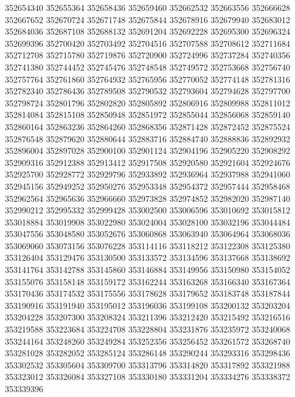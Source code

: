 { 352654340
 352655364
 352658436
 352659460
 352662532
 352663556
 352666628
 352667652
 352670724
 352671748
 352675844
 352678916
 352679940
 352683012
 352684036
 352687108
 352688132
 352691204
 352692228
 352695300
 352696324
 352699396
 352700420
 352703492
 352704516
 352707588
 352708612
 352711684
 352712708
 352715780
 352719876
 352720900
 352724996
 352737284
 352740356
 352741380
 352744452
 352745476
 352748548
 352749572
 352753668
 352756740
 352757764
 352761860
 352764932
 352765956
 352770052
 352774148
 352781316
 352782340
 352786436
 352789508
 352790532
 352793604
 352794628
 352797700
 352798724
 352801796
 352802820
 352805892
 352806916
 352809988
 352811012
 352814084
 352815108
 352850948
 352851972
 352855044
 352856068
 352859140
 352860164
 352863236
 352864260
 352868356
 352871428
 352872452
 352875524
 352876548
 352879620
 352880644
 352883716
 352884740
 352888836
 352892932
 352896004
 352897028
 352900100
 352901124
 352904196
 352905220
 352908292
 352909316
 352912388
 352913412
 352917508
 352920580
 352921604
 352924676
 352925700
 352928772
 352929796
 352933892
 352936964
 352937988
 352941060
 352945156
 352949252
 352950276
 352953348
 352954372
 352957444
 352958468
 352962564
 352965636
 352966660
 352973828
 352974852
 352982020
 352987140
 352990212
 352995332
 352999428
 353002500
 353006596
 353010692
 353015812
 353018884
 353019908
 353022980
 353024004
 353028100
 353032196
 353044484
 353047556
 353048580
 353052676
 353060868
 353063940
 353064964
 353068036
 353069060
 353073156
 353076228
 353114116
 353118212
 353122308
 353125380
 353126404
 353129476
 353130500
 353133572
 353134596
 353137668
 353138692
 353141764
 353142788
 353145860
 353146884
 353149956
 353150980
 353154052
 353155076
 353158148
 353159172
 353162244
 353163268
 353166340
 353167364
 353170436
 353174532
 353175556
 353178628
 353179652
 353183748
 353187844
 353190916
 353191940
 353195012
 353196036
 353199108
 353200132
 353203204
 353204228
 353207300
 353208324
 353211396
 353212420
 353215492
 353216516
 353219588
 353223684
 353224708
 353228804
 353231876
 353235972
 353240068
 353244164
 353248260
 353249284
 353252356
 353256452
 353261572
 353268740
 353281028
 353282052
 353285124
 353286148
 353290244
 353293316
 353298436
 353302532
 353305604
 353309700
 353313796
 353314820
 353317892
 353321988
 353323012
 353326084
 353327108
 353330180
 353331204
 353334276
 353338372
 353339396

}
